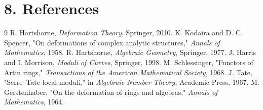 \section*{8. References}


\begin{thebibliography}{9}
 R. Hartshorne, \emph{Deformation Theory}, Springer, 2010.
 K. Kodaira and D. C. Spencer, "On deformations of complex analytic structures," \emph{Annals of Mathematics}, 1958.
 R. Hartshorne, \emph{Algebraic Geometry}, Springer, 1977.
 J. Harris and I. Morrison, \emph{Moduli of Curves}, Springer, 1998.
 M. Schlessinger, "Functors of Artin rings," \emph{Transactions of the American Mathematical Society}, 1968.
 J. Tate, "Serre--Tate local moduli," in \emph{Algebraic Number Theory}, Academic Press, 1967.
 M. Gerstenhaber, "On the deformation of rings and algebras," \emph{Annals of Mathematics}, 1964.
\end{thebibliography}
